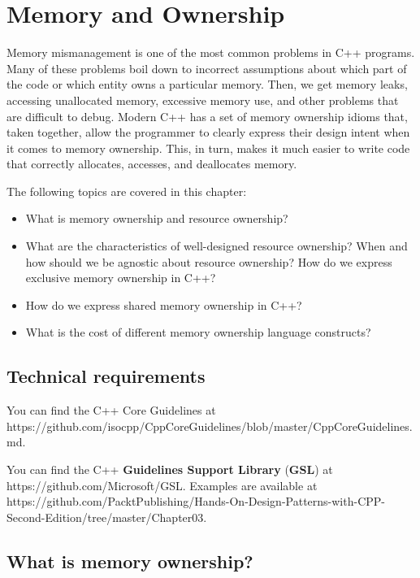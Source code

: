 ﻿\chapter{Memory and Ownership}

Memory mismanagement is one of the most common problems in C++ programs. Many of these problems boil down to incorrect assumptions about which part of the code or which entity owns a particular memory. Then, we get memory leaks, accessing unallocated memory, excessive memory use, and other problems that are difficult to debug. Modern C++ has a set of memory ownership idioms that, taken together, allow the programmer to clearly express their design intent when it comes to memory ownership. This, in turn, makes it much easier to write code that correctly allocates, accesses, and deallocates memory.

The following topics are covered in this chapter:

\begin{itemize}
\item
  What is memory ownership and resource ownership?
\item
  What are the characteristics of well-designed resource ownership? When and how should we be agnostic about resource ownership? How do we express exclusive memory ownership in C++?
\item
  How do we express shared memory ownership in C++?
\item
  What is the cost of different memory ownership language constructs?
\end{itemize}

\section{Technical requirements}

You can find the C++ Core Guidelines at https://github.com/isocpp/CppCoreGuidelines/blob/master/CppCoreGuidelines.md.

You can find the C++ \textbf{Guidelines Support Library} (\textbf{GSL}) at https://github.com/Microsoft/GSL. Examples are available at https://github.com/PacktPublishing/Hands-On-Design-Patterns-with-CPP-Second-Edition/tree/master/Chapter03.

\section{What is memory ownership?}

